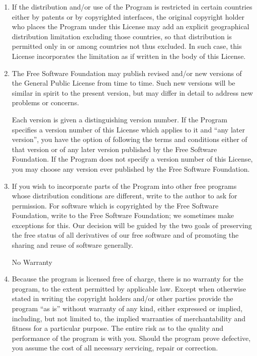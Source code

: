 \documentclass[12pt,a4paper]{article}
\begin{document}
\begin{enumerate}
This section is intended to make thoroughly clear what is believed to
be a consequence of the rest of this License.

\item
If the distribution and/or use of the Program is restricted in
certain countries either by patents or by copyrighted interfaces, the
original copyright holder who places the Program under this License
may add an explicit geographical distribution limitation excluding
those countries, so that distribution is permitted only in or among
countries not thus excluded.  In such case, this License incorporates
the limitation as if written in the body of this License.

\item
The Free Software Foundation may publish revised and/or new versions
of the General Public License from time to time.  Such new versions will
be similar in spirit to the present version, but may differ in detail to
address new problems or concerns.

Each version is given a distinguishing version number.  If the Program
specifies a version number of this License which applies to it and ``any
later version'', you have the option of following the terms and conditions
either of that version or of any later version published by the Free
Software Foundation.  If the Program does not specify a version number of
this License, you may choose any version ever published by the Free Software
Foundation.

\item
If you wish to incorporate parts of the Program into other free
programs whose distribution conditions are different, write to the author
to ask for permission.  For software which is copyrighted by the Free
Software Foundation, write to the Free Software Foundation; we sometimes
make exceptions for this.  Our decision will be guided by the two goals
of preserving the free status of all derivatives of our free software and
of promoting the sharing and reuse of software generally.

\begin{center}
{\Large\sc
No Warranty
}
\end{center}

\item
{\sc Because the program is licensed free of charge, there is no warranty
for the program, to the extent permitted by applicable law.  Except when
otherwise stated in writing the copyright holders and/or other parties
provide the program ``as is'' without warranty of any kind, either expressed
or implied, including, but not limited to, the implied warranties of
merchantability and fitness for a particular purpose.  The entire risk as
to the quality and performance of the program is with you.  Should the
program prove defective, you assume the cost of all necessary servicing,
repair or correction.}


\end{enumerate}
\end{document}
